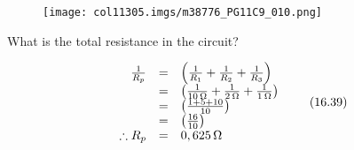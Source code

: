 	\begin{figure}[H] %
    \begin{center}
    \label{m38776*id66331!!!underscore!!!media}\label{m38776*id66331!!!underscore!!!printimage}\texttt{[image: col11305.imgs/m38776\_PG11C9\_010.png]} %
      \vspace{2pt}
    \vspace{.1in}
    \end{center}
 \end{figure}       
          \par 
          \label{m38776*id663318}What is the total resistance in the circuit?\par 
          \label{m38776*id66342}\nopagebreak\noindent{}
            
    \begin{equation}
    \begin{array}{ccc}\hfill \frac{1}{{R}_{p}}& =& \left(\frac{1}{{R}_{1}}+\frac{1}{{R}_{2}}+\frac{1}{{R}_{3}}\right)\hfill \\ & =& \left(\frac{1}{10\phantom{\rule{0.166667em}{0ex}}\Omega }+\frac{1}{2\phantom{\rule{0.166667em}{0ex}}\Omega }+\frac{1}{1\phantom{\rule{0.166667em}{0ex}}\Omega }\right)\hfill \\ & =& \left(\frac{1+5+10}{10}\right)\hfill \\ & =& \left(\frac{16}{10}\right)\hfill \\ \hfill \therefore {R}_{p}& =& 0,625\phantom{\rule{0.166667em}{0ex}}\Omega \hfill \end{array}\tag{16.39}
      \end{equation}
          \label{m38776*eip-234}
